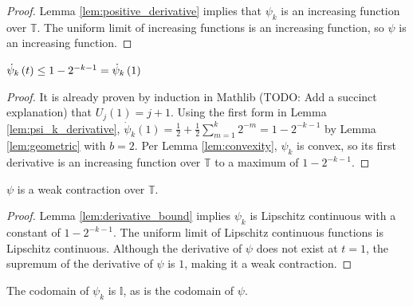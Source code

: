 \begin{proof}
  Lemma \ref{lem:positive_derivative} implies that $\psi_k$ is an increasing function over $\mathbb{T}$. The uniform limit of increasing functions is an increasing function, so $\psi$ is an increasing function.
\end{proof}

\begin{lemma}
  \label{lem:derivative_bound}
  $\dot{\psi}_{k}\left(t\right) \leq 1 - 2^{-k - 1} = \dot{\psi}_k\left(1\right)$
\end{lemma}

\begin{proof}
  It is already proven by induction in Mathlib (TODO: Add a succinct explanation) that $U_j\left(1\right) = j + 1$. Using the first form in Lemma \ref{lem:psi_k_derivative}, $\dot{\psi}_k\left(1\right) = \frac{1}{2} + \frac{1}{2} \sum\limits_{m = 1}^k 2^{-m} = 1 - 2^{-k - 1}$ by Lemma \ref{lem:geometric} with $b = 2$. Per Lemma \ref{lem:convexity}, $\psi_k$ is convex, so its first derivative is an increasing function over $\mathbb{T}$ to a maximum of $1 - 2^{-k - 1}$.
\end{proof}

\begin{lemma}
  \label{lem:contraction}
  $\psi$ is a weak contraction over $\mathbb{T}$.
\end{lemma}

\begin{proof}
  Lemma \ref{lem:derivative_bound} implies $\psi_k$ is Lipschitz continuous with a constant of $1 - 2^{-k - 1}$. The uniform limit of Lipschitz continuous functions is Lipschitz continuous. Although the derivative of $\psi$ does not exist at $t = 1$, the supremum of the derivative of $\psi$ is $1$, making it a weak contraction.
\end{proof}

\begin{lemma}
  \label{lem:codomain}
  The codomain of $\psi_k$ is $\mathbb{I}$, as is the codomain of $\psi$.
\end{lemma}


